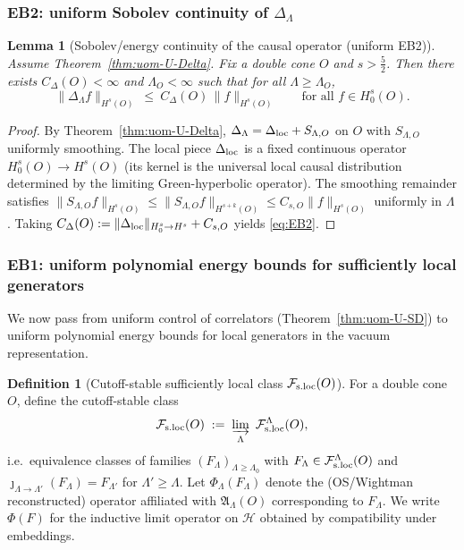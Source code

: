 \documentclass[10pt]{article}
\newcommand{\Fsloc}{\mathcal F_{\rm s.loc}}
\theoremstyle{definition}
\newtheorem{definition}{Definition}[section]
\theoremstyle{plain}
\newtheorem{lemma}{Lemma}[section]
\begin{document}
\subsubsection*{EB2: uniform Sobolev continuity of $\Delta_\Lambda$}

\begin{lemma}[Sobolev/energy continuity of the causal operator (uniform EB2)]
\label{lem:EB2-uniform}
Assume Theorem~\ref{thm:uom-U-Delta}.  Fix a double cone $O$ and $s>\frac52$.
Then there exists $C_\Delta(O)<\infty$ and $\Lambda_O<\infty$ such that for all $\Lambda\ge \Lambda_O$,
\begin{equation}
\|\Delta_\Lambda f\|_{H^{s}(O)}\ \le\ C_\Delta(O)\,\|f\|_{H^{s}(O)}
\qquad\text{for all }f\in H^s_0(O).
\label{eq:EB2}
\end{equation}
\end{lemma}

\begin{proof}
By Theorem~\ref{thm:uom-U-Delta}, $\Delta_\Lambda=\Delta_{\rm loc}+S_{\Lambda,O}$ on $O$ with $S_{\Lambda,O}$ uniformly smoothing.
The local piece $\Delta_{\rm loc}$ is a fixed continuous operator $H^s_0(O)\to H^s(O)$ (its kernel is the universal local causal
distribution determined by the limiting Green-hyperbolic operator).  The smoothing remainder satisfies
$\|S_{\Lambda,O}f\|_{H^{s}(O)}\le \|S_{\Lambda,O}f\|_{H^{s+k}(O)}\le C_{s,O}\|f\|_{H^s(O)}$ uniformly in $\Lambda$.
Taking $C_\Delta(O):=\|\Delta_{\rm loc}\|_{H^s_0\to H^s}+C_{s,O}$ yields \eqref{eq:EB2}.
\end{proof}


\subsubsection*{EB1: uniform polynomial energy bounds for sufficiently local generators}

We now pass from uniform control of correlators (Theorem~\ref{thm:uom-U-SD}) to uniform polynomial
energy bounds for local generators in the vacuum representation.

\begin{definition}[Cutoff-stable sufficiently local class $\Fsloc(O)$]
\label{def:Fsloc-limit}
For a double cone $O$, define the cutoff-stable class
\[
\Fsloc(O)\;:=\;\varinjlim_{\Lambda}\ \mathcal F_{\rm s.loc}^\Lambda(O),
\]
i.e.\ equivalence classes of families $(F_\Lambda)_{\Lambda\ge\Lambda_0}$ with $F_\Lambda\in\mathcal F_{\rm s.loc}^\Lambda(O)$ and
$\jmath_{\Lambda\to\Lambda'}(F_\Lambda)=F_{\Lambda'}$ for $\Lambda'\ge\Lambda$.
Let $\Phi_\Lambda(F_\Lambda)$ denote the (OS/Wightman reconstructed) operator affiliated with $\mathfrak A_\Lambda(O)$ corresponding to $F_\Lambda$.
We write $\Phi(F)$ for the inductive limit operator on $\mathcal H$ obtained by compatibility under embeddings.
\end{definition}
\end{document}
